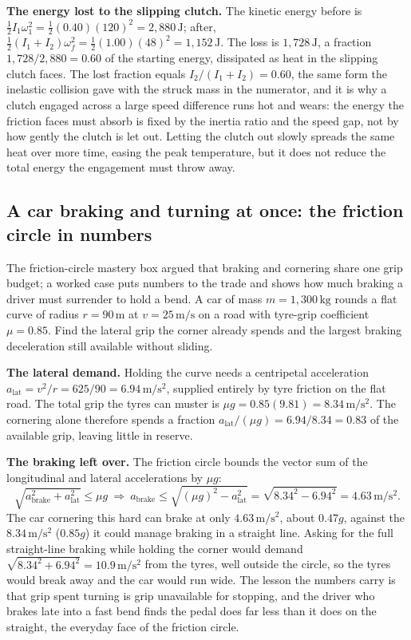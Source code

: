 \textbf{The energy lost to the slipping clutch.} The kinetic energy
before is $\tfrac{1}{2}I_{1}\omega_{1}^{2}=\tfrac{1}{2}(0.40)(120)^{2}=
2{,}880\,\si{\joule}$; after, $\tfrac{1}{2}(I_{1}+I_{2})\omega_{f}^{2}=
\tfrac{1}{2}(1.00)(48)^{2}=1{,}152\,\si{\joule}$. The loss is
$1{,}728\,\si{\joule}$, a fraction $1{,}728/2{,}880=0.60$ of the
starting energy, dissipated as heat in the slipping clutch faces. The
lost fraction equals $I_{2}/(I_{1}+I_{2})=0.60$, the same form the
inelastic collision gave with the struck mass in the numerator, and it
is why a clutch engaged across a large speed difference runs hot and
wears: the energy the friction faces must absorb is fixed by the inertia
ratio and the speed gap, not by how gently the clutch is let out. Letting
the clutch out slowly spreads the same heat over more time, easing the
peak temperature, but it does not reduce the total energy the engagement
must throw away.

\subsection{A car braking and turning at once: the friction circle in
numbers}

The friction-circle mastery box argued that braking and cornering share
one grip budget; a worked case puts numbers to the trade and shows how
much braking a driver must surrender to hold a bend. A car of mass
$m=1{,}300\,\si{\kilogram}$ rounds a flat curve of radius $r=90\,\si{
\meter}$ at $v=25\,\si{\meter\per\second}$ on a road with tyre-grip
coefficient $\mu=0.85$. Find the lateral grip the corner already spends
and the largest braking deceleration still available without sliding.

\textbf{The lateral demand.} Holding the curve needs a centripetal
acceleration $a_{\text{lat}}=v^{2}/r=625/90=6.94\,\si{\meter\per\second
\squared}$, supplied entirely by tyre friction on the flat road. The
total grip the tyres can muster is $\mu g=0.85(9.81)=8.34\,\si{\meter\per
\second\squared}$. The cornering alone therefore spends a fraction
$a_{\text{lat}}/(\mu g)=6.94/8.34=0.83$ of the available grip, leaving
little in reserve.

\textbf{The braking left over.} The friction circle bounds the vector
sum of the longitudinal and lateral accelerations by $\mu g$:
\[
\sqrt{a_{\text{brake}}^{2}+a_{\text{lat}}^{2}}\le\mu g
\ \Rightarrow\
a_{\text{brake}}\le\sqrt{(\mu g)^{2}-a_{\text{lat}}^{2}}
=\sqrt{8.34^{2}-6.94^{2}}=4.63\,\si{\meter\per\second\squared}.
\]
The car cornering this hard can brake at only $4.63\,\si{\meter\per
\second\squared}$, about $0.47g$, against the $8.34\,\si{\meter\per
\second\squared}$ ($0.85g$) it could manage braking in a straight line.
Asking for the full straight-line braking while holding the corner would
demand $\sqrt{8.34^{2}+6.94^{2}}=10.9\,\si{\meter\per\second\squared}$
from the tyres, well outside the circle, so the tyres would break away
and the car would run wide. The lesson the numbers carry is that grip
spent turning is grip unavailable for stopping, and the driver who
brakes late into a fast bend finds the pedal does far less than it does
on the straight, the everyday face of the friction circle.

